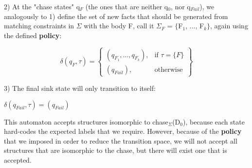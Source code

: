 \documentclass[11pt, a4paper, dvipsnames]{article}
\begin{document}
2) At the "chase states" q$_{F}$ (the ones that are neither q$_{0}$, nor q$_{Fail}$), we analogously to 1) define the set of new facts that should be generated from matching constraints in $\Sigma$ with the body F, call it $\Sigma_{F}$ = $\{$F$_{1}$, ..., F$_{k}\}$, again using the defined \textbf{policy}:
\begin{center}
\[\delta(q_{F},\tau) = \left\{\begin{array}{lr}
        (q_{F_{1}}, ..., q_{F_{k}}), & \text{if } \tau = \{F\}\\
        (q_{Fail}), & \text{otherwise} 
        \end{array}\right\}
  \] 
\end{center}
3) The final sink state will only transition to itself:
\begin{center}
$\delta(q_{Fail},\tau) = (q_{Fail})$ 
\end{center}
This automaton accepts structures isomorphic to chase$_{\Sigma}$(D$_{0}$), because each state hard-codes the expected labels that we require. However, because of the \textbf{policy} that we imposed in order to reduce the transition space, we will not accept all structures that are isomorphic to the chase, but there will exist one that is accepted.
\end{document}
